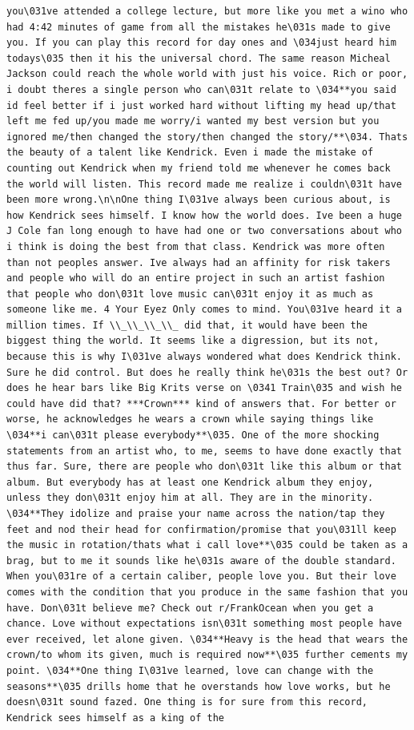 \documentclass[
  letterpaper,
  DIV=11,
  numbers=noendperiod]{scrreprt}
\begin{document}
\begin{verbatim}
you\031ve attended a college lecture, but more like you met a wino who had 4:42 minutes of game from all the mistakes he\031s made to give you. If you can play this record for day ones and \034just heard him todays\035 then it his the universal chord. The same reason Micheal Jackson could reach the whole world with just his voice. Rich or poor, i doubt theres a single person who can\031t relate to \034**you said id feel better if i just worked hard without lifting my head up/that left me fed up/you made me worry/i wanted my best version but you ignored me/then changed the story/then changed the story/**\034. Thats the beauty of a talent like Kendrick. Even i made the mistake of counting out Kendrick when my friend told me whenever he comes back the world will listen. This record made me realize i couldn\031t have been more wrong.\n\nOne thing I\031ve always been curious about, is how Kendrick sees himself. I know how the world does. Ive been a huge J Cole fan long enough to have had one or two conversations about who i think is doing the best from that class. Kendrick was more often than not peoples answer. Ive always had an affinity for risk takers and people who will do an entire project in such an artist fashion that people who don\031t love music can\031t enjoy it as much as someone like me. 4 Your Eyez Only comes to mind. You\031ve heard it a million times. If \\_\\_\\_\\_ did that, it would have been the biggest thing the world. It seems like a digression, but its not, because this is why I\031ve always wondered what does Kendrick think. Sure he did control. But does he really think he\031s the best out? Or does he hear bars like Big Krits verse on \0341 Train\035 and wish he could have did that? ***Crown*** kind of answers that. For better or worse, he acknowledges he wears a crown while saying things like \034**i can\031t please everybody**\035. One of the more shocking statements from an artist who, to me, seems to have done exactly that thus far. Sure, there are people who don\031t like this album or that album. But everybody has at least one Kendrick album they enjoy, unless they don\031t enjoy him at all. They are in the minority. \034**They idolize and praise your name across the nation/tap they feet and nod their head for confirmation/promise that you\031ll keep the music in rotation/thats what i call love**\035 could be taken as a brag, but to me it sounds like he\031s aware of the double standard. When you\031re of a certain caliber, people love you. But their love comes with the condition that you produce in the same fashion that you have. Don\031t believe me? Check out r/FrankOcean when you get a chance. Love without expectations isn\031t something most people have ever received, let alone given. \034**Heavy is the head that wears the crown/to whom its given, much is required now**\035 further cements my point. \034**One thing I\031ve learned, love can change with the seasons**\035 drills home that he overstands how love works, but he doesn\031t sound fazed. One thing is for sure from this record, Kendrick sees himself as a king of the 
\end{verbatim}
\end{document}
